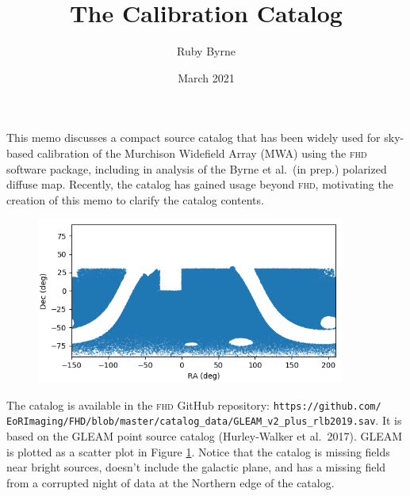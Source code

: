 \documentclass[a4paper,11pt]{article}
\title{The Calibration Catalog}
\author{Ruby Byrne}
\date{March 2021}
\begin{document}
\maketitle

This memo discusses a compact source catalog that has been widely used for sky-based calibration of the Murchison Widefield Array (MWA) using the \textsc{fhd} software package, including in analysis of the Byrne et al.\ (in prep.) polarized diffuse map. Recently, the catalog has gained usage beyond \textsc{fhd}, motivating the creation of this memo to clarify the catalog contents.

\begin{figure}
\centering
\includegraphics[width=4in]{GLEAM_all_plot.png}
\caption{}
\label{fig:gleam}
\end{figure}

The catalog is available in the \textsc{fhd} GitHub repository: \texttt{https://github.com/ EoRImaging/FHD/blob/master/catalog\_data/GLEAM\_v2\_plus\_rlb2019.sav}. It is based on the GLEAM point source catalog (Hurley-Walker et al.\ 2017). GLEAM is plotted as a scatter plot in Figure \ref{fig:gleam}. Notice that the catalog is missing fields near bright sources, doesn't include the galactic plane, and has a missing field from a corrupted night of data at the Northern edge of the catalog.
\end{document}
